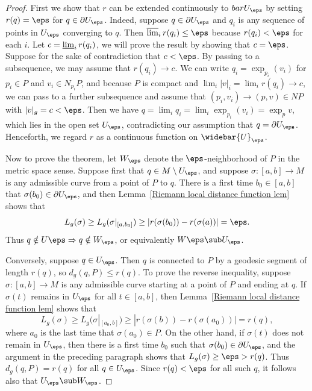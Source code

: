 \begin{proof}
First we show that $r$ can be extended continuously to $\-bar{U}_\eps$ by setting $r(q)=\eps$ for $q\in\partial U_\eps$. Indeed, suppose $q\in\partial U_\eps$ and 
$q_i$ is any sequence of points in $U_\eps$ converging to $q$. Then $\varlimsup_ir(q_i)\leq\eps$ because $r(q_i)<\eps$ for each $i$. Let $c=\varliminf_ir(q_i)$, we will 
prove the result by showing that $c=\eps$. Suppose for the sake of contradiction that $c<\eps$. By passing to a subsequence, we may assume that $r(q_i)\to c$. We can 
write $q_i=\exp_{p_i}(v_i)$ for $p_i\in P$ and $v_i\in N_{p_i}P$, and because $P$ is compact and $\lim_i|v|_i=\lim_ir(q_i)\to c$, we can pass to a further subsequence 
and assume that $(p_i,v_i)\to(p,v)\in NP$ with $|v|_g=c<\eps$. Then we have $q=\lim_iq_i=\lim_i\exp_{p_i}(v_i)=\exp_pv$, which lies in the open set $U_\eps$, 
contradicting our assumption that $q=\partial U_\eps$. Henceforth, we regard $r$ as a continuous function on $\widebar{U}_\eps$.\par
Now to prove the theorem, let $W_\eps$ denote the $\eps$-neighborhood of $P$ in the metric space sense. Suppose first that $q\in M\setminus U_\eps$, and suppose 
$\sigma:[a,b]\to M$ is any admissible curve from a point of $P$ to $q$. There is a first time $b_0\in[a,b]$ that $\sigma(b_0)\in\partial U_\eps$, and then Lemma~\ref{Riemann local distance function lem} 
shows that
\[L_g(\sigma)\geq L_g(\sigma|_{[a,b_0]})\geq|r(\sigma(b_0))-r(\sigma(a))|=\eps.\]
Thus $q\notin U\eps\Rightarrow q\notin W_\eps$, or equivalently $W\eps\sub U_\eps$.\par
Conversely, suppose $q\in U_\eps$. Then $q$ is connected to $P$ by a geodesic segment of length $r(q)$, so $d_g(q,P)\leq r(q)$. To prove the reverse inequality, suppose 
$\sigma:[a,b]\to M$ is any admissible curve starting at a point of $P$ and ending at $q$. If $\sigma(t)$ remains in $U_\eps$ for all $t\in[a,b]$, then Lemma~\ref{Riemann local distance function lem} 
shows that
\[L_g(\sigma)\geq L_g(\sigma|_{[a_0,b]})\geq|r(\sigma(b))-r(\sigma(a_0))|=r(q),\]
where $a_0$ is the last time that $\sigma(a_0)\in P$. On the other hand, if $\sigma(t)$ does not remain in $U_\eps$, then there is a first time $b_0$ such that $\sigma(b_0)\in\partial U_\eps$, 
and the argument in the preceding paragraph shows that $L_g(\sigma)\geq\eps>r(q)$. Thus $d_g(q,P)=r(q)$ for all $q\in U_\eps$. Since $r(q)<\eps$ for all such $q$, it 
follows also that $U_\eps\sub W_\eps$.
\end{proof}
